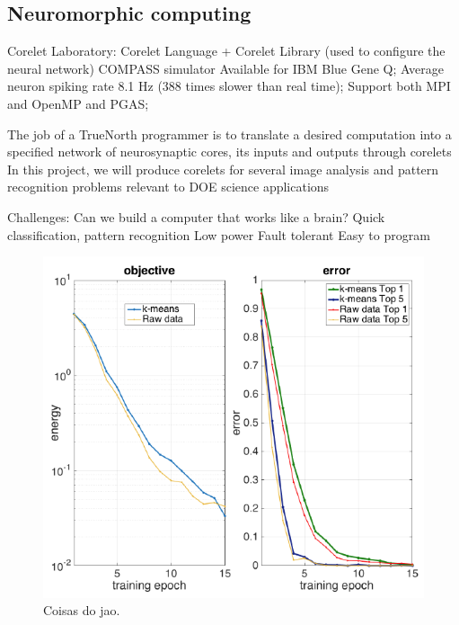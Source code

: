 \subsection{Neuromorphic computing}
Corelet Laboratory: Corelet Language + Corelet Library (used to configure the neural network)
COMPASS simulator
Available for IBM Blue Gene Q;
Average neuron spiking rate 8.1 Hz (388 times slower than real time);
Support both MPI and OpenMP and PGAS;

The job of a TrueNorth programmer is to translate a desired computation into a specified network of neurosynaptic cores, its inputs and outputs through corelets
In this project, we will produce corelets for several image analysis and pattern recognition problems relevant to DOE science applications

Challenges: Can we build a computer that works like a brain?
Quick classification, pattern recognition
Low power
Fault tolerant
Easy to program



\begin{figure}[h]
\centering
\includegraphics[width=\linewidth]{img/joao3.png}
\caption{Coisas do jao.}
\label{fig:cryem}
\end{figure}


